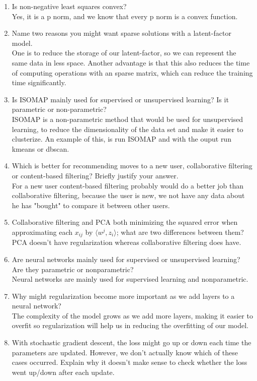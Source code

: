 \documentclass{article}
\def\ans#1{{\color{ans}#1}}
\def\enum#1{\begin{enumerate}#1\end{enumerate}}
\begin{document}
\enum{
\item Is non-negative least squares convex? \\
\ans{
    Yes, it is a p norm, and we know that every p norm is a convex function.
}
\item Name two reasons you might want sparse solutions with a latent-factor model. \\
\ans{
    One is to reduce the storage of our latent-factor, so we can represent the same data 
    in less space. Another advantage is that this also reduces the time of computing operations 
    with an sparse matrix, which can reduce the training time significantly.
}
\item Is ISOMAP mainly used for supervised or unsupervised learning? Is it parametric or non-parametric? \\
\ans{
    ISOMAP is a non-parametric method that would be used for unsupervised learning, to reduce the 
    dimensionality of the data set and make it easier to clusterize. An example of this, is run ISOMAP 
    and with the ouput run kmeans or dbscan.
}
\item Which is better for recommending moves to a new user, collaborative filtering or content-based filtering? Briefly justify your answer. \\
\ans{
    For a new user content-based filtering probably would do a better job than collaborative filtering, 
    because the user is new, we not have any data about he has "bought" to compare it between other users.
}
\item Collaborative filtering and PCA both minimizing the squared error when approximating each $x_{ij}$ by $\langle w^j, z_i\rangle$; what are two differences between them? \\
\ans{
    PCA doesn't have regularization whereas collaborative filtering does have.  %
}
\item{Are neural networks mainly used for supervised or unsupervised learning? Are they parametric or nonparametric?} \\
\ans{
    Neural networks are mainly used for supervised learning and nonparametric.
}
\item{Why might regularization become more important as we add layers to a neural network?} \\
\ans{
    The complexity of the model grows as we add more layers, making it easier to overfit 
    so regularization will help us in reducing the overfitting of our model.
}
\item With stochastic gradient descent, the loss might go up or down each time the parameters are updated. However, we don't actually know which of these cases occurred. Explain why it doesn't make sense to check whether the loss went up/down after each update. \\
}
\end{document}
